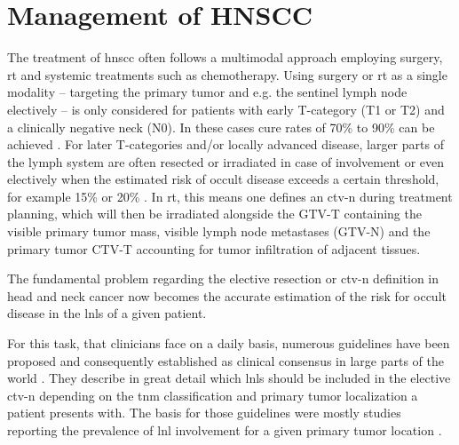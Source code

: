 \documentclass[\relativeRoot/main.tex]{subfiles}
\begin{document}
\section{Management of HNSCC}
\label{sec:intro:management}

The treatment of \gls{hnscc} often follows a multimodal approach employing surgery, \acrlong{rt} and systemic treatments such as chemotherapy. Using surgery or \acrlong{rt} as a single modality -- targeting the primary tumor and e.g. the sentinel lymph node electively -- is only considered for patients with early T-category (T1 or T2) and a clinically negative neck (N0). In these cases cure rates of 70\% to 90\% can be achieved \cite{pfister_head_2014}. For later T-categories and/or locally advanced disease, larger parts of the lymph system are often resected or irradiated in case of involvement or even electively when the estimated risk of occult disease exceeds a certain threshold, for example 15\% or 20\% \cite{weiss_use_1997,pitman_rationale_2000,pillsbury_iii_rationale_1997}. In \acrlong{rt}, this means one defines an \gls{ctv-n} during treatment planning, which will then be irradiated alongside the GTV-T containing the visible primary tumor mass, visible lymph node metastases (GTV-N) and the primary tumor CTV-T accounting for tumor infiltration of adjacent tissues.

The fundamental problem regarding the elective resection or \gls{ctv-n} definition in head and neck cancer now becomes the accurate estimation of the risk for occult disease in the \glspl{lnl} of a given patient.

For this task, that clinicians face on a daily basis, numerous guidelines have been proposed and consequently established as clinical consensus in large parts of the world \cite{gregoire_ct-based_2003,gregoire_delineation_2014,gregoire_delineation_2018,gregoire_proposal_2006,gregoire_selection_2000,biau_selection_2019,eisbruch_intensity-modulated_2002,ferlito_elective_2009,vorwerk_guidelines_2011,chao_determination_2002}. They describe in great detail which \glspl{lnl} should be included in the elective \gls{ctv-n} depending on the \gls{tnm} classification and primary tumor localization a patient presents with. The basis for those guidelines were mostly studies reporting the prevalence of \gls{lnl} involvement for a given primary tumor location \cite{candela_patterns_1990,shah_patterns_1990,woolgar_histological_1999,woolgar_topography_2007,chao_determination_2002,vauterin_patterns_2006,razfar_incidence_2009,ho_patterns_2012}.
\end{document}
